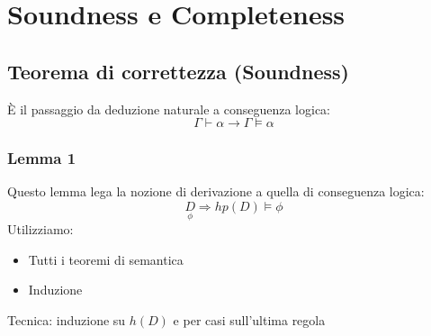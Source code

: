 \documentclass{article}
\theoremstyle{break}
\theoremstyle{break}
\theoremstyle{break}
\theoremstyle{break}
\begin{document}
\section{Soundness e Completeness}
\subsection{Teorema di correttezza (Soundness)}
È il passaggio da deduzione naturale a conseguenza logica:
\[
    \Gamma \vdash \alpha \to \Gamma \models \alpha
\] 
\subsubsection{Lemma 1}
Questo lemma lega la nozione di derivazione a quella di conseguenza logica:
\[
    \underset{\phi}{D} \Rightarrow hp(D) \models \phi
\] 
Utilizziamo:
\begin{itemize}
    \item Tutti i teoremi di semantica
    \item Induzione
\end{itemize}
Tecnica: induzione su \( h(D) \) e per casi sull'ultima regola
\end{document}
